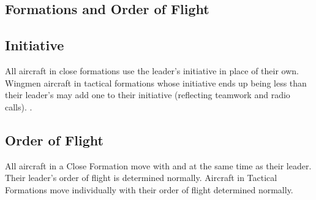 \begin{advancedrules}

    \section{Formations and Order of Flight}

    \subsection{Initiative} All aircraft in close formations use the leader's initiative in place of their own. Wingmen aircraft in tactical formations whose initiative ends up being less than their leader's may add one to their initiative (reflecting teamwork and radio calls). .

    \subsection{Order of Flight} All aircraft in a Close Formation move with and at the same time as their leader. Their leader's order of flight is determined normally. Aircraft in Tactical Formations move individually with their order of flight determined normally.

\end{advancedrules}
